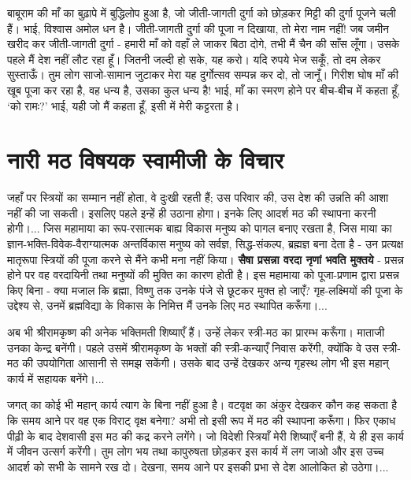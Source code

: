 बाबूराम की माँ का बुढ़ापे में बुद्धिलोप हुआ है, जो जीती-जागती दुर्गा को छोड़कर मिट्टी की दुर्गा पूजने चली हैं। भाई, विश्वास अमोल धन है। जीती-जागती दुर्गा की पूजा न दिखाया, तो मेरा नाम नहीं! जब जमीन खरीद कर जीती-जागती दुर्गा - हमारी माँ को वहाँ ले जाकर बिठा दोगे, तभी मैं चैन की साँस लूँगा। उसके पहले मैं देश नहीं लौट रहा हूँ। जितनी जल्दी हो सके, यह करो। यदि रुपये भेज सकूँ, तो दम लेकर सुस्ताऊँ। तुम लोग साजो-सामान जुटाकर मेरा यह दुर्गोत्सव सम्पन्न कर दो, तो जानूँ। गिरीश घोष माँ की खूब पूजा कर रहा है, वह धन्य है, उसका कुल धन्य है! भाई, माँ का स्मरण होने पर बीच-बीच में कहता हूँ, ‘को रामः?’ भाई, यही जो मैं कहता हूँ, इसी में मेरी कट्टरता है।


\section*{नारी मठ विषयक स्वामीजी के विचार}


जहाँ पर स्त्रियों का सम्मान नहीं होता, वे दुःखी रहती हैं; उस परिवार की, उस देश की उन्नति की आशा नहीं की जा सकती। इसलिए पहले इन्हें ही उठाना होगा। इनके लिए आदर्श मठ की स्थापना करनी होगी।... जिस महामाया का रूप-रसात्मक बाह्य विकास मनुष्य को पागल बनाए रखता है, जिस माया का ज्ञान-भक्ति-विवेक-वैराग्यात्मक अन्तर्विकास मनुष्य को सर्वज्ञ, सिद्ध-संकल्प, ब्रह्मज्ञ बना देता है - उन प्रत्यक्ष मातृरूपा स्त्रियों की पूजा करने से मैंने कभी मना नहीं किया। \textbf{सैषा प्रसन्ना वरदा नृणां भवति मुक्तये } - प्रसन्न होने पर वह वरदायिनी तथा मनुष्यों की मुक्ति का कारण होती है। इस महामाया को पूजा-प्रणाम द्वारा प्रसन्न किए बिना - क्या मजाल कि ब्रह्मा, विष्णु तक उनके पंजे से छूटकर मुक्त हो जाएँ? गृह-लक्ष्मियों की पूजा के उद्देश्य से, उनमें ब्रह्मविद्या के विकास के निमित्त मैं उनके लिए मठ स्थापित करूँगा।... 

अब भी श्रीरामकृष्ण की अनेक भक्तिमती शिष्याएँ हैं। उन्हें लेकर स्त्री-मठ का प्रारम्भ करूँगा। माताजी उनका केन्द्र बनेंगी। पहले उसमें श्रीरामकृष्ण के भक्तों की स्त्री-कन्याएँ निवास करेंगी, क्योंकि वे उस स्त्री-मठ की उपयोगिता आसानी से समझ सकेंगी। उसके बाद उन्हें देखकर अन्य गृहस्थ लोग भी इस महान् कार्य में सहायक बनेंगे।... 

जगत् का कोई भी महान् कार्य त्याग के बिना नहीं हुआ है। वटवृक्ष का अंकुर देखकर कौन कह सकता है कि समय आने पर वह एक विराट् वृक्ष बनेगा? अभी तो इसी रूप में मठ की स्थापना करूँगा। फिर एकाध पीढ़ी के बाद देशवासी इस मठ की कद्र करने लगेंगे। जो विदेशी स्त्रियाँ मेरी शिष्याएँ बनी हैं, ये ही इस कार्य में जीवन उत्सर्ग करेंगी। तुम लोग भय तथा कापुरुषता छोड़कर इस कार्य में लग जाओ और इस उच्च आदर्श को सभी के सामने रख दो। देखना, समय आने पर इसकी प्रभा से देश आलोकित हो उठेगा।... 

